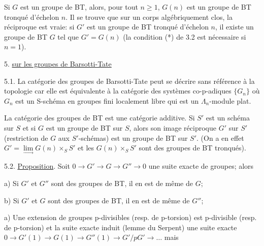 
Si $G$ est un groupe de BT, alors, pour tout $n \geq 1$, $G(n)$
est un groupe de BT tronqué d'échelon $n$. Il se trouve que sur un
corps algébriquement clos, la réciproque est vraie: si $G'$ est un
groupe de BT tronqué d'échelon $n$, il existe un groupe de BT $G$ tel
que $G' = G(n)$ (la condition (*) de 3.2 est nécessaire si $n = 1$).

 5. \uline{ sur les groupes de Barsotti-Tate}

5.1. La catégorie des groupes de Barsotti-Tate peut se décrire sans
référence à la topologie  car elle est équivalente à la catégorie
des systèmes co-p-adiques $\{G_n\}$ où $G_n$ est un S-schéma en groupes fini
localement libre qui est un $\Lambda_n$-module plat.

La catégorie des groupes de BT est une catégorie additive.
Si $S'$ est un schéma sur $S$ et si $G$ est un groupe de BT sur $S$,
alors son image réciproque $G'$ sur $S'$ (restriction de $G$ aux
$S'$-schémas) est un groupe de BT sur $S'$. (On a en effet
$G' = \lim\limits_{\rightarrow} G(n) \times_S S'$ et les $G(n) \times_S S'$ sont des groupes de BT tronqués).

5.2. \uline{Proposition}. Soit $0 \rightarrow G' \rightarrow G \rightarrow G'' \rightarrow 0$ une suite exacte
de groupes; alors

a) Si $G'$ et $G''$ sont des groupes de BT, il en est de même de $G$;

b) Si $G'$ et $G$ sont des groupes de BT, il en est de même de $G''$;

a) Une extension de groupes p-divisibles (resp. de p-torsion) est
p-divisible (resp. de p-torsion) et la suite exacte induit (lemme du
Serpent) une suite exacte $0 \rightarrow G'(1) \rightarrow G(1) \rightarrow G''(1) \rightarrow G'/pG' \rightarrow \ldots$ mais


